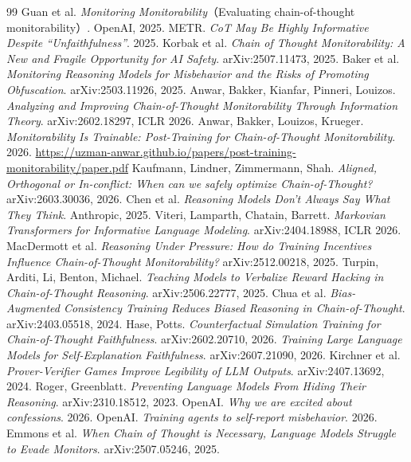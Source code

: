 \documentclass[11pt,a4paper]{ctexart}
\begin{document}
\begin{thebibliography}{99}
\small
{} Guan et al. \textit{Monitoring Monitorability}（Evaluating chain-of-thought monitorability）. OpenAI, 2025.
 METR. \textit{CoT May Be Highly Informative Despite ``Unfaithfulness''}. 2025.
 Korbak et al. \textit{Chain of Thought Monitorability: A New and Fragile Opportunity for AI Safety}. arXiv:2507.11473, 2025.
 Baker et al. \textit{Monitoring Reasoning Models for Misbehavior and the Risks of Promoting Obfuscation}. arXiv:2503.11926, 2025.
 Anwar, Bakker, Kianfar, Pinneri, Louizos. \textit{Analyzing and Improving Chain-of-Thought Monitorability Through Information Theory}. arXiv:2602.18297, ICLR 2026.
 Anwar, Bakker, Louizos, Krueger. \textit{Monitorability Is Trainable: Post-Training for Chain-of-Thought Monitorability}. 2026. \url{https://uzman-anwar.github.io/papers/post-training-monitorability/paper.pdf}
 Kaufmann, Lindner, Zimmermann, Shah. \textit{Aligned, Orthogonal or In-conflict: When can we safely optimize Chain-of-Thought?} arXiv:2603.30036, 2026.
 Chen et al. \textit{Reasoning Models Don't Always Say What They Think}. Anthropic, 2025.
 Viteri, Lamparth, Chatain, Barrett. \textit{Markovian Transformers for Informative Language Modeling}. arXiv:2404.18988, ICLR 2026.
 MacDermott et al. \textit{Reasoning Under Pressure: How do Training Incentives Influence Chain-of-Thought Monitorability?} arXiv:2512.00218, 2025.
 Turpin, Arditi, Li, Benton, Michael. \textit{Teaching Models to Verbalize Reward Hacking in Chain-of-Thought Reasoning}. arXiv:2506.22777, 2025.
 Chua et al. \textit{Bias-Augmented Consistency Training Reduces Biased Reasoning in Chain-of-Thought}. arXiv:2403.05518, 2024.
 Hase, Potts. \textit{Counterfactual Simulation Training for Chain-of-Thought Faithfulness}. arXiv:2602.20710, 2026.
 \textit{Training Large Language Models for Self-Explanation Faithfulness}. arXiv:2607.21090, 2026.
 Kirchner et al. \textit{Prover-Verifier Games Improve Legibility of LLM Outputs}. arXiv:2407.13692, 2024.
 Roger, Greenblatt. \textit{Preventing Language Models From Hiding Their Reasoning}. arXiv:2310.18512, 2023.
 OpenAI. \textit{Why we are excited about confessions}. 2026.
 OpenAI. \textit{Training agents to self-report misbehavior}. 2026.
 Emmons et al. \textit{When Chain of Thought is Necessary, Language Models Struggle to Evade Monitors}. arXiv:2507.05246, 2025.
\end{thebibliography}
\end{document}
